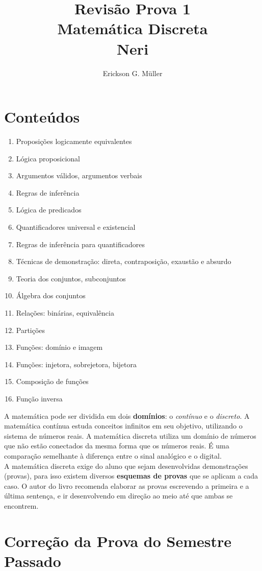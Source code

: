 \documentclass[]{article}
\title{Revisão Prova 1\\Matemática Discreta\\Neri}
\author{Erickson G. Müller}
\begin{document}
	\maketitle
	\section*{Conteúdos}
		\begin{enumerate}
			\item Proposições logicamente equivalentes
			\item Lógica proposicional
			\item Argumentos válidos, argumentos verbais
			\item Regras de inferência
			\item Lógica de predicados
			\item Quantificadores universal e existencial
			\item Regras de inferência para quantificadores
			\item Técnicas de demonstração: direta, contraposição, exaustão e absurdo
			\item Teoria dos conjuntos, subconjuntos
			\item Álgebra dos conjuntos
			\item Relações: binárias, equivalência
			\item Partições
			\item Funções: domínio e imagem
			\item Funções: injetora, sobrejetora, bijetora
			\item Composição de funções
			\item Função inversa
		\end{enumerate}
	\newpage
	A matemática pode ser dividida em dois \textbf{domínios}: o \textit{contínuo} e o \textit{discreto}. A matemática contínua estuda conceitos infinitos em seu objetivo, utilizando o sistema de números reais. A matemática discreta utiliza um domínio de números que não estão conectados da mesma forma que os números reais. É uma comparação semelhante à diferença entre o sinal analógico e o digital.\\
	
	A matemática discreta exige do aluno que sejam desenvolvidas demonstrações (provas), para isso existem diversos \textbf{esquemas de provas} que se aplicam a cada caso. O autor do livro recomenda elaborar as provas escrevendo a primeira e a última sentença, e ir desenvolvendo em direção ao meio até que ambas se encontrem.
\newpage
	\section{Correção da Prova do Semestre Passado}
\end{document}
